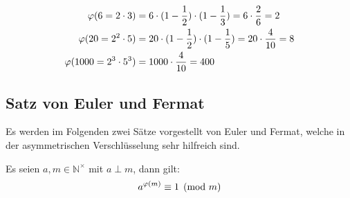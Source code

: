 \begin{example}
  \begin{align*}
    \varphi(6 = 2 \cdot 3)        & = 6 \cdot (1 - \frac{1}{2}) \cdot (1 - \frac{1}{3}) =
    6 \cdot \frac{2}{6} = 2                                                              \\
    \varphi(20 = 2^2 \cdot 5)     & = 20 \cdot (1 - \frac{1}{2}) \cdot (1 - \frac{1}{5}) =
    20 \cdot \frac{4}{10} = 8                                                            \\
    \varphi(1000 = 2^3 \cdot 5^3) & = 1000 \cdot \frac{4}{10} = 400
  \end{align*}
\end{example}
\subsection{Satz von Euler und Fermat}
Es werden im Folgenden zwei Sätze vorgestellt von Euler und Fermat, welche
in der asymmetrischen Verschlüsselung sehr hilfreich sind.
\begin{satz}
  Es seien $a,m \in \mathbb{N}^\times$ mit $a \perp m$, dann gilt:
  \begin{equation*}
    a^{\varphi(m)} \equiv 1 \pmod{m}
  \end{equation*}
\end{satz}
